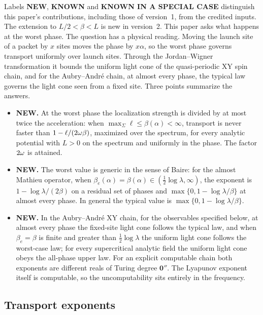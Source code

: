 Labels \textbf{NEW}, \textbf{KNOWN} and \textbf{KNOWN IN A SPECIAL CASE} distinguish this paper's contributions, including those of version~1, from the credited inputs. The extension to $L/2<\beta<L$ is new in version~2. This paper asks what happens at the worst phase. The question has a physical reading. Moving the launch site of a packet by $x$ sites moves the phase by $x\alpha$, so the worst phase governs transport uniformly over launch sites. Through the Jordan--Wigner transformation it bounds the uniform light cone of the quasi-periodic XY spin chain, and for the Aubry--Andr\'e chain, at almost every phase, the typical law governs the light cone seen from a fixed site. Three points summarize the answers.
\begin{itemize}
\item \textbf{NEW.} At the worst phase the localization strength is divided by at most twice the acceleration: when $\max_\Sigma\ell\le\beta(\alpha)<\infty$, transport is never faster than $1-\ell/(2\omega\beta)$, maximized over the spectrum, for every analytic potential with $L>0$ on the spectrum and uniformly in the phase. The factor $2\omega$ is attained.
\item \textbf{NEW.} The worst value is generic in the sense of Baire: for the almost Mathieu operator, when $\beta_e(\alpha)=\beta(\alpha)\in(\tfrac12\log\lambda,\infty)$, the exponent is $1-\log\lambda/(2\beta)$ on a residual set of phases and $\max\{0,1-\log\lambda/\beta\}$ at almost every phase. In general the typical value is $\max\{0,1-\log\lambda/\beta\}$.
\item \textbf{NEW.} In the Aubry--Andr\'e XY chain, for the observables specified below, at almost every phase the fixed-site light cone follows the typical law, and when $\beta_e=\beta$ is finite and greater than $\tfrac12\log\lambda$ the uniform light cone follows the worst-case law; for every supercritical analytic field the uniform light cone obeys the all-phase upper law. For an explicit computable chain both exponents are different reals of Turing degree $\mathbf 0''$. The Lyapunov exponent itself is computable, so the uncomputability sits entirely in the frequency.
\end{itemize}

\subsection{Transport exponents}

